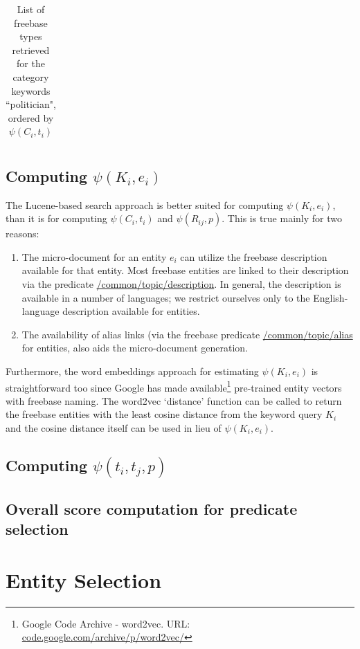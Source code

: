 \documentclass[a4paper, twoside, 12pt]{report}
\begin{document}
\begin{longtable}{| p{} | p{} |}
\caption{List of freebase types retrieved for the category keywords ``politician", ordered by $\psi(C_i,t_i)$}
\label{tab:politician}
\end{longtable}

\subsection{Computing $\psi(K_i, e_i)$}
The Lucene-based search approach is better suited for computing $\psi(K_i, e_i)$, than it is for computing $\psi(C_i, t_i)$ and $\psi(R_{ij}, p)$. This is true mainly for two reasons:
\begin{enumerate}
\item The micro-document for an entity $e_i$ can utilize the freebase description available for that entity. Most freebase entities are linked to their description via the predicate \url{/common/topic/description}. In general, the description is available in a number of languages; we restrict ourselves only to the English-language description available for entities.
\item The availability of alias links (via the freebase predicate \url{/common/topic/alias} for entities, also aids the micro-document generation.
\end{enumerate}

Furthermore, the word embeddings approach for estimating $\psi(K_i,e_i)$ is straightforward too since Google has made available\footnote{Google Code Archive - word2vec. URL: \url{code.google.com/archive/p/word2vec/}} pre-trained entity vectors with freebase naming. The word2vec `distance' function can be called to return the freebase entities with the least cosine distance from the keyword query $K_i$ and the cosine distance itself can be used in lieu of $\psi(K_i,e_i)$.

\subsection{Computing $\psi(t_i, t_j, p)$}

\subsection{Overall score computation for predicate selection}

\section{Entity Selection}
\end{document}
